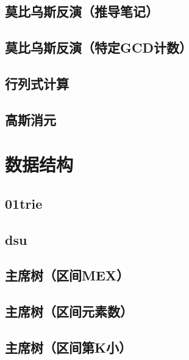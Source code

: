 \documentclass[11pt,a4paper]{ctexart}
\begin{document}
\subsection{莫比乌斯反演（推导笔记）}


\subsection{莫比乌斯反演（特定GCD计数）}


\subsection{行列式计算}


\subsection{高斯消元}


\section{数据结构}
\subsection{01trie}


\subsection{dsu}


\subsection{主席树（区间MEX）}


\subsection{主席树（区间元素数）}


\subsection{主席树（区间第K小）}

\end{document}
